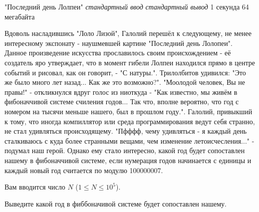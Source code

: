 \begin{problem}%
{"Последний день Лолпеи"}%
{\textsl{стандартный ввод}}%
{\textsl{стандартный вывод}}%
{1 секунда}%
{64 мегабайта}{}

Вдоволь насладившись "Лоло Лизой", Галолий перешёл к следующему, не менее интересному экспонату - наушмевшей картине "Последний день Лолопеи". Данное произведение искусства прославилось своим происхождением - её создатель яро утверждает, что в момент гибели Лолпеи находился прямо в центре событий и рисовал, как он говорит, - "С натуры.". Трилолбитов удивился: "Это же было много лет назад... Как же это возможно?". "Моолодой человек, Вы не правы!" - откликнулся вдруг голос из ниоткуда - "Как известно, мы живём в фибоначчивой системе счиления годов... Так что, вполне вероятно, что год с номером на тысячи меньше нашего, был в прошлом году.". Галолий, привыкший к тому, что иногда компиллятор или среда программирования ведут себя странно, не стал удивляться происходящему. "Пфффф, чему удивляться - я каждый день сталкиваюсь с куда более странными вещами, чем изменение летоисчесления..." - подумал наш герой. Однако ему стало интересно, какой год будет сопоставлен нашему в фибоначчивой системе, если нумерация годов начинается с единицы и каждый новый год считается по модулю 100000007.


\InputFile

Вам вводится число $N$ ($1 \le N \le 10^5$).

\OutputFile

Выведите какой год в фиббоначивой системе будет сопоставлен нашему.

\Examples

\begin{example}
%
%
%
%
%
\end{example}
\end{problem}
